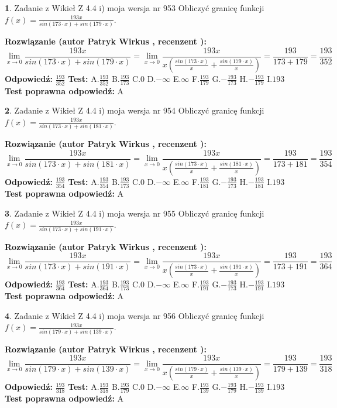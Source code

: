 \documentclass[12pt, a4paper]{article}
\theoremstyle{definition} %
\newtheorem{zad}{}
\newcommand{\zadStart}[1]{\begin{zad}#1\newline}
\newcommand{\zadStop}{\end{zad}}
\newcommand{\rozwStart}[2]{\noindent \textbf{Rozwiązanie (autor #1 , recenzent #2): }\newline}
\newcommand{\rozwStop}{\newline}
\newcommand{\odpStart}{\noindent \textbf{Odpowiedź:}\newline}
\newcommand{\odpStop}{\newline}
\newcommand{\testStart}{\noindent \textbf{Test:}\newline}
\newcommand{\testStop}{\newline}
\newcommand{\kluczStart}{\noindent \textbf{Test poprawna odpowiedź:}\newline}
\newcommand{\kluczStop}{\newline}
\begin{document}
\zadStart{Zadanie z Wikieł Z 4.4 i) moja wersja nr 953}
Obliczyć granicę funkcji $f(x)=\frac{193x}{sin(173\cdot x) +sin(179\cdot x)}$.
\zadStop
\rozwStart{Patryk Wirkus}{}
$$\lim\limits_{x\to 0}\frac{193x}{sin(173\cdot x) +sin(179\cdot x)}=\lim\limits_{x\to 0}\frac{193x}{x(\frac{sin(173\cdot x)}{x}+\frac{sin(179\cdot x)}{x})}=\frac{193}{173+179} = \frac{193}{352}$$
\rozwStop
\odpStart
$\frac{193}{352}$
\odpStop
\testStart
A.$\frac{193}{352}$
B.$\frac{193}{173}$
C.$0$
D.$-\infty$
E.$\infty$
F.$\frac{193}{179}$
G.$-\frac{193}{173}$
H.$-\frac{193}{179}$
I.$193$
\testStop
\kluczStart
A
\kluczStop



\zadStart{Zadanie z Wikieł Z 4.4 i) moja wersja nr 954}
Obliczyć granicę funkcji $f(x)=\frac{193x}{sin(173\cdot x) +sin(181\cdot x)}$.
\zadStop
\rozwStart{Patryk Wirkus}{}
$$\lim\limits_{x\to 0}\frac{193x}{sin(173\cdot x) +sin(181\cdot x)}=\lim\limits_{x\to 0}\frac{193x}{x(\frac{sin(173\cdot x)}{x}+\frac{sin(181\cdot x)}{x})}=\frac{193}{173+181} = \frac{193}{354}$$
\rozwStop
\odpStart
$\frac{193}{354}$
\odpStop
\testStart
A.$\frac{193}{354}$
B.$\frac{193}{173}$
C.$0$
D.$-\infty$
E.$\infty$
F.$\frac{193}{181}$
G.$-\frac{193}{173}$
H.$-\frac{193}{181}$
I.$193$
\testStop
\kluczStart
A
\kluczStop



\zadStart{Zadanie z Wikieł Z 4.4 i) moja wersja nr 955}
Obliczyć granicę funkcji $f(x)=\frac{193x}{sin(173\cdot x) +sin(191\cdot x)}$.
\zadStop
\rozwStart{Patryk Wirkus}{}
$$\lim\limits_{x\to 0}\frac{193x}{sin(173\cdot x) +sin(191\cdot x)}=\lim\limits_{x\to 0}\frac{193x}{x(\frac{sin(173\cdot x)}{x}+\frac{sin(191\cdot x)}{x})}=\frac{193}{173+191} = \frac{193}{364}$$
\rozwStop
\odpStart
$\frac{193}{364}$
\odpStop
\testStart
A.$\frac{193}{364}$
B.$\frac{193}{173}$
C.$0$
D.$-\infty$
E.$\infty$
F.$\frac{193}{191}$
G.$-\frac{193}{173}$
H.$-\frac{193}{191}$
I.$193$
\testStop
\kluczStart
A
\kluczStop



\zadStart{Zadanie z Wikieł Z 4.4 i) moja wersja nr 956}
Obliczyć granicę funkcji $f(x)=\frac{193x}{sin(179\cdot x) +sin(139\cdot x)}$.
\zadStop
\rozwStart{Patryk Wirkus}{}
$$\lim\limits_{x\to 0}\frac{193x}{sin(179\cdot x) +sin(139\cdot x)}=\lim\limits_{x\to 0}\frac{193x}{x(\frac{sin(179\cdot x)}{x}+\frac{sin(139\cdot x)}{x})}=\frac{193}{179+139} = \frac{193}{318}$$
\rozwStop
\odpStart
$\frac{193}{318}$
\odpStop
\testStart
A.$\frac{193}{318}$
B.$\frac{193}{179}$
C.$0$
D.$-\infty$
E.$\infty$
F.$\frac{193}{139}$
G.$-\frac{193}{179}$
H.$-\frac{193}{139}$
I.$193$
\testStop
\kluczStart
A
\kluczStop
\end{document}
